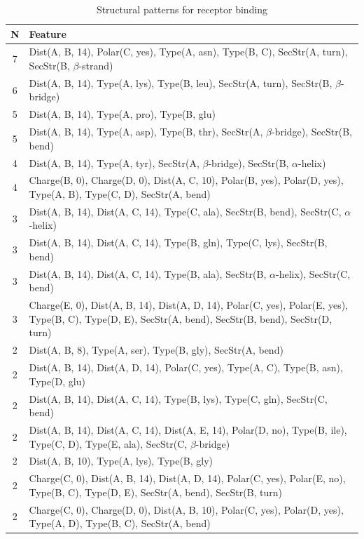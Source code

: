 \documentclass[11pt,twoside,a4paper]{book}
\begin{document}
\begin{table}\begin{tabularx}{\textwidth}{cX}\textbf{N} & \textbf{Feature} \\ \hline  
7 & Dist(A, B, 14), Polar(C, yes),  Type(A, asn), Type(B, C), SecStr(A, turn), \newline SecStr(B, $\beta$-strand)\\ \hline 
6 & Dist(A, B, 14),  Type(A, lys), Type(B, leu), SecStr(A, turn), SecStr(B, $\beta$-bridge)\\ \hline 
5 & Dist(A, B, 14),  Type(A, pro), Type(B, glu)\\ \hline 
5 & Dist(A, B, 14),  Type(A, asp), Type(B, thr), SecStr(A, $\beta$-bridge), SecStr(B, bend)\\ \hline 
4 & Dist(A, B, 14),  Type(A, tyr), SecStr(A, $\beta$-bridge), SecStr(B, $\alpha$-helix)\\ \hline 
4 & Charge(B, 0), Charge(D, 0), Dist(A, C, 10), Polar(B, yes), Polar(D, yes),  \newline Type(A, B), Type(C, D), SecStr(A, bend)\\ \hline 
3 & Dist(A, B, 14), Dist(A, C, 14),  Type(C, ala), SecStr(B, bend), SecStr(C, $\alpha$-helix)\\ \hline 
3 & Dist(A, B, 14), Dist(A, C, 14),  Type(B, gln), Type(C, lys), SecStr(B, bend)\\ \hline 
3 & Dist(A, B, 14), Dist(A, C, 14),  Type(B, ala), SecStr(B, $\alpha$-helix), SecStr(C, bend)\\ \hline 
3 & Charge(E, 0), Dist(A, B, 14), Dist(A, D, 14), Polar(C, yes), Polar(E, yes),  \newline Type(B, C), Type(D, E), SecStr(A, bend), SecStr(B, bend), SecStr(D, turn)\\ \hline 
2 & Dist(A, B, 8),  Type(A, ser), Type(B, gly), SecStr(A, bend)\\ \hline 
2 & Dist(A, B, 14), Dist(A, D, 14), Polar(C, yes),  Type(A, C), Type(B, asn), \newline Type(D, glu)\\ \hline 
2 & Dist(A, B, 14), Dist(A, C, 14),  Type(B, lys), Type(C, gln), SecStr(C, bend)\\ \hline 
2 & Dist(A, B, 14), Dist(A, C, 14), Dist(A, E, 14), Polar(D, no),  Type(B, ile), \newline Type(C, D), Type(E, ala), SecStr(C, $\beta$-bridge)\\ \hline 
2 & Dist(A, B, 10),  Type(A, lys), Type(B, gly)\\ \hline 
2 & Charge(C, 0), Dist(A, B, 14), Dist(A, D, 14), Polar(C, yes), Polar(E, no),  \newline Type(B, C), Type(D, E), SecStr(A, bend), SecStr(B, turn)\\ \hline 
2 & Charge(C, 0), Charge(D, 0), Dist(A, B, 10), Polar(C, yes), Polar(D, yes),  \newline Type(A, D), Type(B, C), SecStr(A, bend)\\ \hline 
 \end{tabularx}\caption{Structural patterns for receptor binding}\label{tab:receptor_binding}\end{table}
\end{document}

